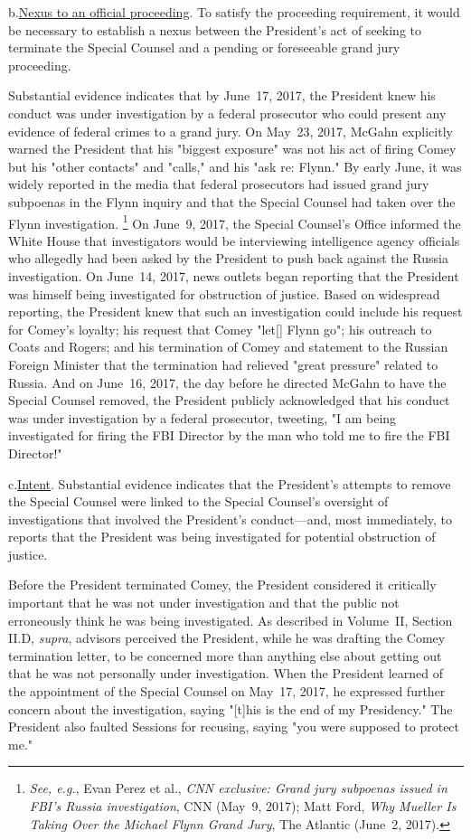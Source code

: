 b.\qquad\underline{Nexus to an official proceeding}.
To satisfy the proceeding requirement, it would be necessary to establish a nexus between the President's act of seeking to terminate the Special Counsel and a pending or foreseeable grand jury proceeding.

Substantial evidence indicates that by June~17, 2017, the President knew his conduct was under investigation by a federal prosecutor who could present any evidence of federal crimes to a grand jury.
On May~23, 2017, McGahn explicitly warned the President that his "biggest exposure" was not his act of firing Comey but his "other contacts" and "calls," and his "ask re: Flynn."
By early June, it was widely reported in the media that federal prosecutors had issued grand jury subpoenas in the Flynn inquiry and that the Special Counsel had taken over the Flynn investigation.%
\footnote{\textit{See, e.g.}, Evan Perez et al., \textit{CNN exclusive: Grand jury subpoenas issued in FBI's Russia investigation}, CNN (May~9, 2017);
Matt Ford, \textit{Why Mueller Is Taking Over the Michael Flynn Grand Jury}, The Atlantic (June~2, 2017).}
On June~9, 2017, the Special Counsel's Office informed the White House that investigators would be interviewing intelligence agency officials who allegedly had been asked by the President to push back against the Russia investigation.
On June~14, 2017, news outlets began reporting that the President was himself being investigated for obstruction of justice.
Based on widespread reporting, the President knew that such an investigation could include his request for Comey's loyalty;
his request that Comey "let[] Flynn go";
his outreach to Coats and Rogers;
and his termination of Comey and statement to the Russian Foreign Minister that the termination had relieved "great pressure" related to Russia.
And on June~16, 2017, the day before he directed McGahn to have the Special Counsel removed, the President publicly acknowledged that his conduct was under investigation by a federal prosecutor, tweeting, "I am being investigated for firing the FBI Director by the man who told me to fire the FBI Director!"

c.\qquad\underline{Intent}.
Substantial evidence indicates that the President's attempts to remove the Special Counsel were linked to the Special Counsel's oversight of investigations that involved the President's conduct---and, most immediately, to reports that the President was being investigated for potential obstruction of justice.

Before the President terminated Comey, the President considered it critically important that he was not under investigation and that the public not erroneously think he was being investigated.
As described in Volume~II, Section II.D, \textit{supra}, advisors perceived the President, while he was drafting the Comey termination letter, to be concerned more than anything else about getting out that he was not personally under investigation.
When the President learned of the appointment of the Special Counsel on May~17, 2017, he expressed further concern about the investigation, saying "[t]his is the end of my Presidency."
The President also faulted Sessions for recusing, saying "you were supposed to protect me."

